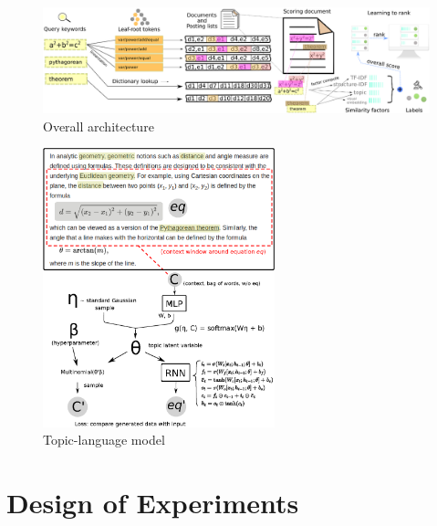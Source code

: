 \documentclass[11pt]{artikel3}
\begin{document}
\begin{figure}[t!]
\centering
\includegraphics[width=1.0\textwidth]{img/architecture}
\caption{Overall architecture}
\end{figure}
\begin{figure}[b!]
\centering
\includegraphics[width=0.6\textwidth]{img/lang-topic}
\caption{Topic-language model}
\end{figure}

\section{Design of Experiments}
\end{document}
